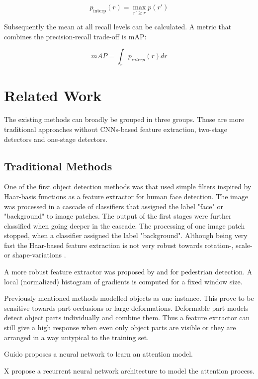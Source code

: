 $$ p_\text{interp}(r) = \max\limits_{r' \geq r} p(r')$$

Subsequently the mean at all recall levels can be calculated. A metric that combines the precision-recall trade-off is \ac{mAP}:


$$ mAP = \int_{r}p_{interp}(r) dr$$


\section{Related Work}
\label{sec:object_detection:related}
The existing methods can broadly be grouped in three groups. Those are more traditional approaches without \acp{CNN}-based feature extraction, two-stage detectors and one-stage detectors.

\subsection{Traditional Methods}

One of the first object detection methods was \cite{Viola2004} that used simple filters inspired by Haar-basis functions as a feature extractor for human face detection. The image was processed in a cascade of classifiers that assigned the label "face" or "background" to image patches. The output of the first stages were further classified when going deeper in the cascade. The processing of one image patch stopped, when a classifier assigned the label "background". Although being very fast the Haar-based feature extraction is not very robust towards rotation-, scale- or shape-variations . 

A more robust feature extractor was proposed by \cite{Dalal} and \cite{Lowe2004} for pedestrian detection. A local (normalized) histogram of gradients is computed for a fixed window size. 

Previously mentioned methods modelled objects as one instance. This prove to be sensitive towards part occlusions or large deformations. Deformable part models detect object parts individually and combine them. Thus a feature extractor can still give a high response when even only object parts are visible or they are arranged in a way untypical to the training set.

Guido proposes a neural network to learn an attention model.

X propose a recurrent neural network architecture to model the attention process.

